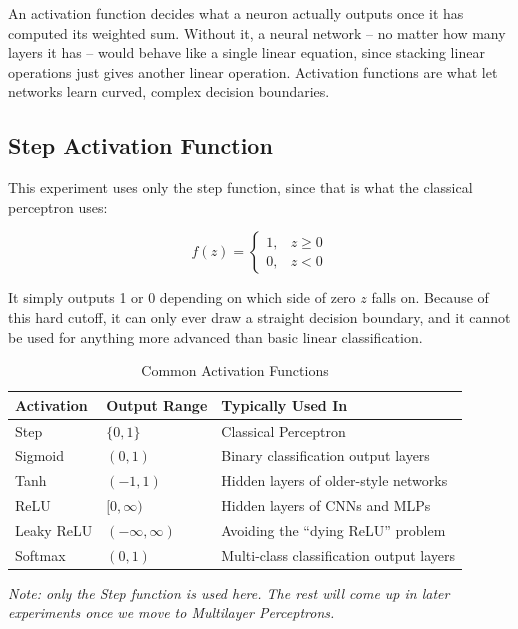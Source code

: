 \documentclass[11pt]{article}
\begin{document}
An activation function decides what a neuron actually outputs once it has computed its weighted sum. Without it, a neural network -- no matter how many layers it has -- would behave like a single linear equation, since stacking linear operations just gives another linear operation. Activation functions are what let networks learn curved, complex decision boundaries.

\subsection*{Step Activation Function}

This experiment uses only the step function, since that is what the classical perceptron uses:

\[
f(z)=
\begin{cases}
1,&z\ge0\\
0,&z<0
\end{cases}
\]

It simply outputs 1 or 0 depending on which side of zero $z$ falls on. Because of this hard cutoff, it can only ever draw a straight decision boundary, and it cannot be used for anything more advanced than basic linear classification.

\begin{table}[H]
\centering
\caption{Common Activation Functions}
\begin{tabular}{lll}
\toprule
\textbf{Activation} & \textbf{Output Range} & \textbf{Typically Used In} \\
\midrule
Step        & $\{0,1\}$          & Classical Perceptron \\
Sigmoid     & $(0,1)$            & Binary classification output layers \\
Tanh        & $(-1,1)$           & Hidden layers of older-style networks \\
ReLU        & $[0,\infty)$       & Hidden layers of CNNs and MLPs \\
Leaky ReLU  & $(-\infty,\infty)$ & Avoiding the ``dying ReLU'' problem \\
Softmax     & $(0,1)$            & Multi-class classification output layers \\
\bottomrule
\end{tabular}
\end{table}

\textit{Note: only the Step function is used here. The rest will come up in later experiments once we move to Multilayer Perceptrons.}

\end{document}
